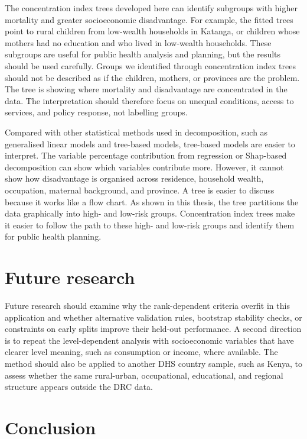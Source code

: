 \documentclass[
  11pt,
  a4paper,
]{article}
\begin{document}
The concentration index trees developed here can identify subgroups with
higher mortality and greater socioeconomic disadvantage. For example,
the fitted trees point to rural children from low-wealth households in
Katanga, or children whose mothers had no education and who lived in
low-wealth households. These subgroups are useful for public health
analysis and planning, but the results should be used carefully. Groups
we identified through concentration index trees should not be described
as if the children, mothers, or provinces are the problem. The tree is
showing where mortality and disadvantage are concentrated in the data.
The interpretation should therefore focus on unequal conditions, access
to services, and policy response, not labelling groups.

Compared with other statistical methods used in decomposition, such as
generalised linear models and tree-based models, tree-based models are
easier to interpret. The variable percentage contribution from
regression or Shap-based decomposition can show which variables
contribute more. However, it cannot show how disadvantage is organised
across residence, household wealth, occupation, maternal background, and
province. A tree is easier to discuss because it works like a flow
chart. As shown in this thesis, the tree partitions the data graphically
into high- and low-risk groups. Concentration index trees make it easier
to follow the path to these high- and low-risk groups and identify them
for public health planning.

\section{Future research}\label{future-research}

Future research should examine why the rank-dependent criteria overfit
in this application and whether alternative validation rules, bootstrap
stability checks, or constraints on early splits improve their held-out
performance. A second direction is to repeat the level-dependent
analysis with socioeconomic variables that have clearer level meaning,
such as consumption or income, where available. The method should also
be applied to another DHS country sample, such as Kenya, to assess
whether the same rural-urban, occupational, educational, and regional
structure appears outside the DRC data.

\section{Conclusion}\label{conclusion}
\end{document}
